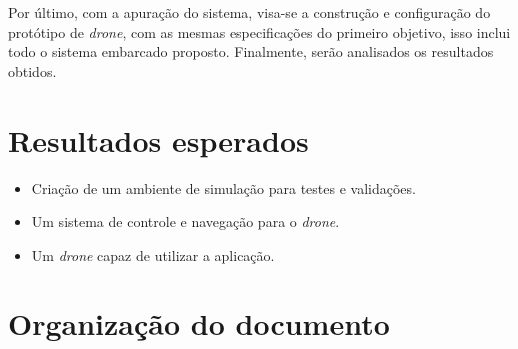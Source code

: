 \documentclass[12pt,a4paper,oneside]{book}
\begin{document}
Por último, com a apuração do sistema, visa-se a construção e configuração do protótipo de \textit{drone}, com as mesmas especificações do primeiro objetivo, isso inclui todo o sistema embarcado proposto. Finalmente, serão analisados os resultados obtidos.  

\section{Resultados esperados}

\begin{itemize}
\item Criação de um ambiente de simulação para testes e validações.
\item Um sistema de controle e navegação para o \textit{drone}.
\item Um \textit{drone} capaz de utilizar a aplicação.     
\end{itemize}

\section{Organização do documento}
\end{document}
